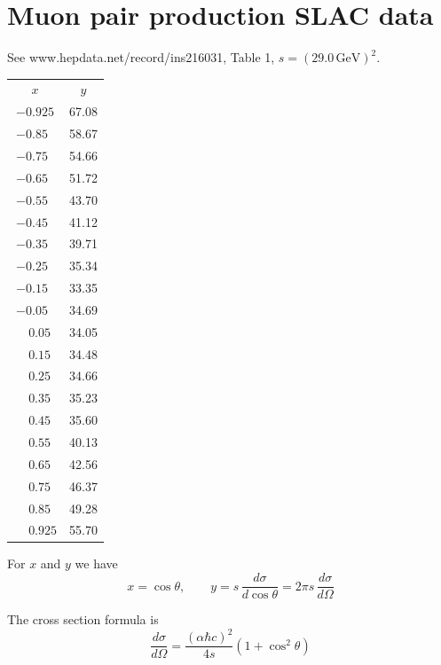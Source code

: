 

\section*{Muon pair production SLAC data}

See www.hepdata.net/record/ins216031, Table 1, $s=(29.0\,\text{GeV})^2$.

\begin{center}
\begin{tabular}{cc}
$x$ & $y$
\\[1ex]
$-0.925$ & 67.08\\
$-0.85\phantom{0}$ & 58.67\\
$-0.75\phantom{0}$ & 54.66\\
$-0.65\phantom{0}$ & 51.72\\
$-0.55\phantom{0}$ & 43.70\\
$-0.45\phantom{0}$ & 41.12\\
$-0.35\phantom{0}$ & 39.71\\
$-0.25\phantom{0}$ & 35.34\\
$-0.15\phantom{0}$ & 33.35\\
$-0.05\phantom{0}$ & 34.69\\
$\phantom{+}0.05\phantom{0}$ & 34.05\\
$\phantom{+}0.15\phantom{0}$ & 34.48\\
$\phantom{+}0.25\phantom{0}$ & 34.66\\
$\phantom{+}0.35\phantom{0}$ & 35.23\\
$\phantom{+}0.45\phantom{0}$ & 35.60\\
$\phantom{+}0.55\phantom{0}$ & 40.13\\
$\phantom{+}0.65\phantom{0}$ & 42.56\\
$\phantom{+}0.75\phantom{0}$ & 46.37\\
$\phantom{+}0.85\phantom{0}$ & 49.28\\
$\phantom{+}0.925$ & 55.70
\end{tabular}
\end{center}

For $x$ and $y$ we have
\begin{equation*}
x=\cos\theta,
\qquad
y=s\,\frac{d\sigma}{d\cos\theta}=2\pi s\,\frac{d\sigma}{d\Omega}
\end{equation*}

The cross section formula is
\begin{equation*}
\frac{d\sigma}{d\Omega}=\frac{(\alpha\hbar c)^2}{4s}\left(1+\cos^2\theta\right)
\end{equation*}

